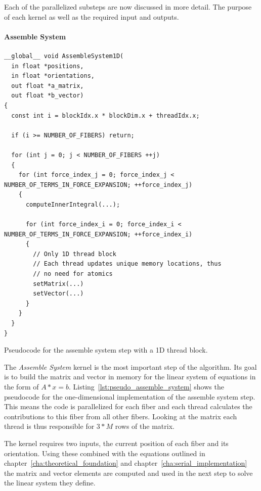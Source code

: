 \documentclass[a4paper,11pt]{kth-mag}
\begin{document}
Each of the parallelized substeps are now discussed in more detail. The purpose of each kernel as well as the required input and outputs.

\paragraph{Assemble System}

\begin{listing}
  \centering
  \begin{verbatim}
__global__ void AssembleSystem1D(
  in float *positions,
  in float *orientations,
  out float *a_matrix,
  out float *b_vector)
{
  const int i = blockIdx.x * blockDim.x + threadIdx.x;

  if (i >= NUMBER_OF_FIBERS) return;

  for (int j = 0; j < NUMBER_OF_FIBERS ++j)
  {
    for (int force_index_j = 0; force_index_j < NUMBER_OF_TERMS_IN_FORCE_EXPANSION; ++force_index_j)
    {
      computeInnerIntegral(...);

      for (int force_index_i = 0; force_index_i < NUMBER_OF_TERMS_IN_FORCE_EXPANSION; ++force_index_i)
      {
        // Only 1D thread block
        // Each thread updates unique memory locations, thus
        // no need for atomics
        setMatrix(...)
        setVector(...)
      }
    }
  }
}
  \end{verbatim}
  \caption{Pseudocode for the assemble system step with a 1D thread block.}
  \label{lst:pseudo_assemble_system}
\end{listing}

The \emph{Assemble System} kernel is the most important step of the algorithm. Its goal is to build the matrix and vector in memory for the linear system of equations in the form of $A*x = b$. Listing~\ref{lst:pseudo_assemble_system} shows the pseudocode for the one-dimensional implementation of the assemble system step. This means the code is parallelized for each fiber and each thread calculates the contributions to this fiber from all other fibers. Looking at the matrix each thread is thus responsible for $3*M$ rows of the matrix.

The kernel requires two inputs, the current position of each fiber and its orientation. Using these combined with the equations outlined in chapter~\ref{cha:theoretical_foundation} and chapter~\ref{cha:serial_implementation} the matrix and vector elements are computed and used in the next step to solve the linear system they define.
\end{document}
